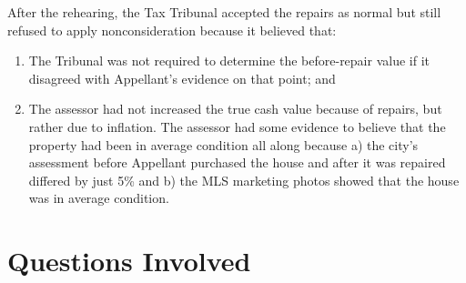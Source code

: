 \documentclass[12pt,\documentclassflag]{michiganCourtOfAppealsBrief}
\begin{document}
After the rehearing, the Tax Tribunal accepted the repairs as normal but still refused to apply nonconsideration because it believed that:

\begin{enumerate}
\item The Tribunal was not required to determine the before-repair value if it disagreed with Appellant's evidence on that point; and
\item The assessor had not increased the true cash value because of repairs, but rather due to inflation. The assessor had some evidence to believe that the property had been in average condition all along because a) the city's assessment before Appellant purchased the house and after it was repaired differed by just 5\% and b) the MLS marketing photos showed that the house was in average condition. 
\end{enumerate}








\newpage 
\section{Questions Involved}
\end{document}
